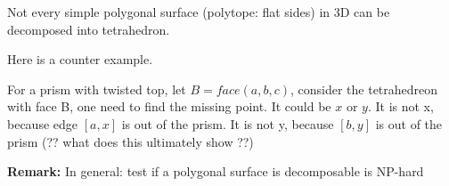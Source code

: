 \documentclass[12pt]{article}
\newcommand{\rmk}[1]{\par {\bf Remark: }{#1}}
\begin{document}
\begin{theorem}
  Not every simple polygonal surface (polytope: flat sides) in 3D can
  be decomposed into tetrahedron.
\end{theorem}

Here is a counter example.

For a prism with twisted top, let $B = face(a, b, c)$, consider the
tetrahedreon with face B, one need to find the missing point. It could
be $x$ or $y$. It is not x, because edge $[a, x]$ is out of the
prism. It is not y, because $[b, y]$ is out of the prism (?? what does
this ultimately show ??)

\rmk{In general: test if a polygonal surface is decomposable is NP-hard}

 \pagebreak


\end{document}
